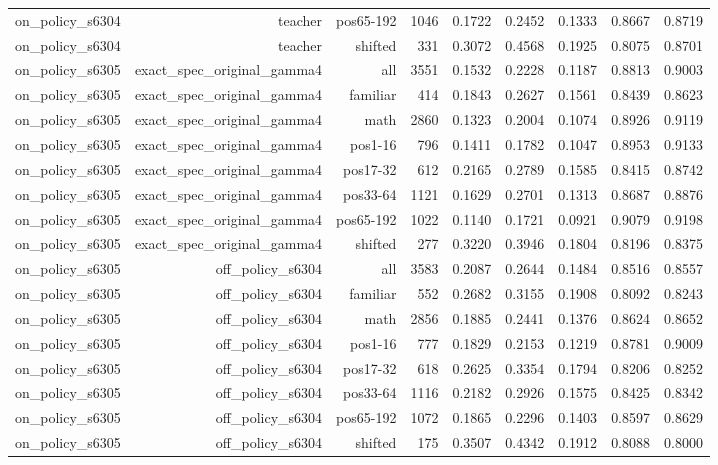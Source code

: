 \begin{tabular}{lrrrrrrrr}
on\_policy\_s6304 & teacher & pos65-192 & 1046 & 0.1722 & 0.2452 & 0.1333 & 0.8667 & 0.8719 \\
on\_policy\_s6304 & teacher & shifted & 331 & 0.3072 & 0.4568 & 0.1925 & 0.8075 & 0.8701 \\
on\_policy\_s6305 & exact\_spec\_original\_gamma4 & all & 3551 & 0.1532 & 0.2228 & 0.1187 & 0.8813 & 0.9003 \\
on\_policy\_s6305 & exact\_spec\_original\_gamma4 & familiar & 414 & 0.1843 & 0.2627 & 0.1561 & 0.8439 & 0.8623 \\
on\_policy\_s6305 & exact\_spec\_original\_gamma4 & math & 2860 & 0.1323 & 0.2004 & 0.1074 & 0.8926 & 0.9119 \\
on\_policy\_s6305 & exact\_spec\_original\_gamma4 & pos1-16 & 796 & 0.1411 & 0.1782 & 0.1047 & 0.8953 & 0.9133 \\
on\_policy\_s6305 & exact\_spec\_original\_gamma4 & pos17-32 & 612 & 0.2165 & 0.2789 & 0.1585 & 0.8415 & 0.8742 \\
on\_policy\_s6305 & exact\_spec\_original\_gamma4 & pos33-64 & 1121 & 0.1629 & 0.2701 & 0.1313 & 0.8687 & 0.8876 \\
on\_policy\_s6305 & exact\_spec\_original\_gamma4 & pos65-192 & 1022 & 0.1140 & 0.1721 & 0.0921 & 0.9079 & 0.9198 \\
on\_policy\_s6305 & exact\_spec\_original\_gamma4 & shifted & 277 & 0.3220 & 0.3946 & 0.1804 & 0.8196 & 0.8375 \\
on\_policy\_s6305 & off\_policy\_s6304 & all & 3583 & 0.2087 & 0.2644 & 0.1484 & 0.8516 & 0.8557 \\
on\_policy\_s6305 & off\_policy\_s6304 & familiar & 552 & 0.2682 & 0.3155 & 0.1908 & 0.8092 & 0.8243 \\
on\_policy\_s6305 & off\_policy\_s6304 & math & 2856 & 0.1885 & 0.2441 & 0.1376 & 0.8624 & 0.8652 \\
on\_policy\_s6305 & off\_policy\_s6304 & pos1-16 & 777 & 0.1829 & 0.2153 & 0.1219 & 0.8781 & 0.9009 \\
on\_policy\_s6305 & off\_policy\_s6304 & pos17-32 & 618 & 0.2625 & 0.3354 & 0.1794 & 0.8206 & 0.8252 \\
on\_policy\_s6305 & off\_policy\_s6304 & pos33-64 & 1116 & 0.2182 & 0.2926 & 0.1575 & 0.8425 & 0.8342 \\
on\_policy\_s6305 & off\_policy\_s6304 & pos65-192 & 1072 & 0.1865 & 0.2296 & 0.1403 & 0.8597 & 0.8629 \\
on\_policy\_s6305 & off\_policy\_s6304 & shifted & 175 & 0.3507 & 0.4342 & 0.1912 & 0.8088 & 0.8000 \\

\end{tabular}
